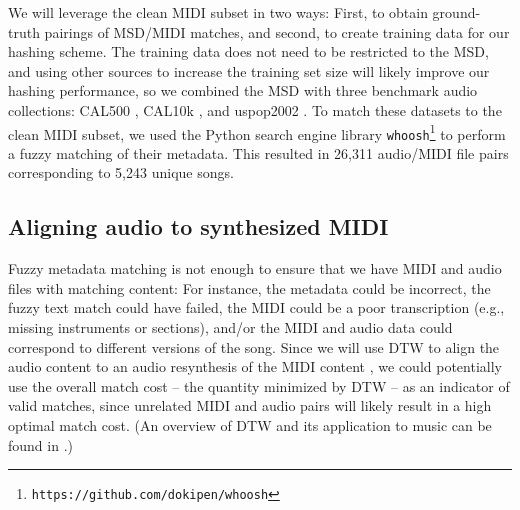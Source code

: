 \documentclass{article}
\begin{document}
We will leverage the clean MIDI subset in two ways: First, to obtain ground-truth pairings of MSD/MIDI matches, and second, to create training data for our hashing scheme.  
The training data does not need to be restricted to the MSD, and using other sources to increase the training set size will likely improve our hashing performance, so we combined the MSD with three benchmark audio collections: CAL500 \cite{turnbull2007towards}, CAL10k \cite{tingle2010exploring}, and uspop2002 \cite{berenzweig2004large}.
To match these datasets to the clean MIDI subset, we used the Python search engine library \texttt{whoosh}\footnote{\texttt{https://github.com/dokipen/whoosh}} to perform a fuzzy matching of their metadata.
This resulted in 26,311 audio/MIDI file pairs corresponding to 5,243 unique songs.

\subsection{Aligning audio to synthesized MIDI}
\label{sec:alignment}

Fuzzy metadata matching is not enough to ensure that we have MIDI and audio files with matching content: For instance, the metadata could be incorrect, the fuzzy text match could have failed, the MIDI could be a poor transcription (e.g., missing instruments or sections), and/or the MIDI and audio data could correspond to different versions of the song.
Since we will use DTW to align the audio content to an audio resynthesis of the MIDI content \cite{turetsky2003ground, hu2003polyphonic,ewert2012towards}, we could potentially use the overall match cost -- the quantity minimized by DTW -- as an indicator of valid matches, since unrelated MIDI and audio pairs will likely result in a high optimal match cost.  (An overview of DTW and its application to music can be found in \cite{muller2007information}.)
\end{document}
